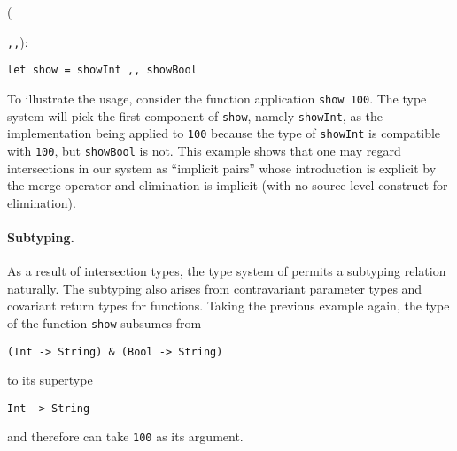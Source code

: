 ({\lstinline{,,}):
\begin{lstlisting}
let show = showInt ,, showBool
\end{lstlisting}

To illustrate the usage, consider the function application \lstinline{show 100}.
The type system will pick the first component of \lstinline{show}, namely
\lstinline{showInt}, as the implementation being applied to \lstinline{100}
because the type of \lstinline{showInt} is compatible with \lstinline{100}, but
\lstinline{showBool} is not. This example shows that one may regard
intersections in our system as ``implicit pairs'' whose introduction is explicit
by the merge operator and elimination is implicit (with no source-level
construct for elimination).








\paragraph{Subtyping.}


As a result of intersection types, the type system of \name permits a subtyping
relation naturally. The subtyping also arises from contravariant parameter types
and covariant return types for functions. Taking the previous example again, the
type of the function \lstinline{show} subsumes from
\begin{lstlisting}
(Int -> String) & (Bool -> String)
\end{lstlisting}
to its supertype
\begin{lstlisting}
Int -> String
\end{lstlisting}
and therefore can take \lstinline{100} as its argument.

}
